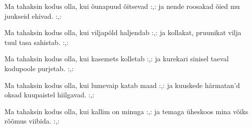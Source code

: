 Ma tahaksin kodus olla,
kui \~ounapuud \~oitsevad
:,: ja nende roosakad \~oied
    mu juukseid ehivad. :,: 

Ma tahaksin kodus olla,
kui viljap\~old haljendab
:,: ja kollakat, pruunikat vilja
    tuul tasa sahistab. :,: 

Ma tahaksin kodus olla,
kui kasemets kolletab
:,: ja kurekari sinisel taeval
    kodupoole purjetab. :,: 

Ma tahaksin kodus olla,
kui lumevaip katab maad
:,: ja kuuskede h\"armatan'd oksad
    kuupaistel hiilgavad. :,: 

Ma tahaksin kodus olla,
kui kallim on minuga
:,: ja temaga \"uheskoos mina
    v\~oiks r\~o\~omus viibida. :,: 